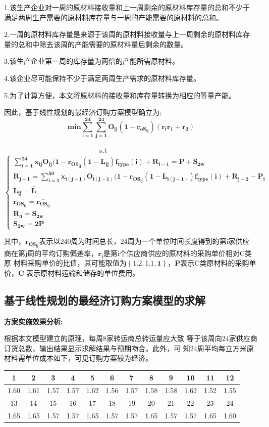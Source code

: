 \documentclass[UTF8]{ctexart}
\begin{document}
1.该生产企业对一周的原材料接收量和上一周剩余的原材料库存量的总和不少于
满足两周生产需要的原材料库存量与一周的产能需要的原材料的总和。

2.一周的原材料库存量是来源于该周的原材料接收量与上一周剩余的原材料库存
量的总和中除去该周的产能需要的原材料量后剩余的数量。

3.该生产企业第一周的库存量为两倍的产能所需原材料。

4.该企业尽可能保持不少于满足两周生产需求的原材料库存量。

5.为了计算方便，本文将原材料的接收量和库存量转换为相应的等量产能。

因此，基于线性规划的最经济订购方案模型确立为:
\begin{equation}
	\mathbf{min\sum_{i=1}^{24} \sum_{j=1}^{24}O_{ij}(1-r_{oS_{ij}})(r_{i}r_{1}+r_{2})}
\end{equation}\par
~~~~~~~~~~~~~~~~~~~~~~~~~~~s.t$\mathbf{\begin{cases}
	\sum_{i=1}^{24}x_{ij}O_{ij}(1-r_{OS_{ij}}(1-L_{ij})f_{type}(i)+R_{i-1}=P+S_{2w}  \\
	R_{j-1}=\sum_{i=1}^{50}x_{i(j-1)}O_{i(j-1)}(1-r_{OS_{ij}}(1-L_{i(j-1)})f_{type}(i)+R_{j-2}-P_{i} \\
	L_{ij}=\bar{L}  \\
	r_{OS_{ij}}=\bar{r_{OS_{ij}}}  \\
	R_{0}=S_{2w}   \\
	S_{2w}=2P
	\end{cases}}$

其中，$\mathbf{r_{OS_{ij}}}$表示以240周为时间总长，24周为一个单位时间长度得到的第i家供应
商在第j周的平均订购偏差率，$\mathbf{r_{i}}$是第i个供应商供应的原材料的采购单价相对C类原
材料采购单价的比值，其可能取值为$\mathbf{\left \{1.2,1.1,1  \right \} }$，$\mathbf{P}$表示C类原材料的采购单价，$\mathbf{C}$
表示原材料运输和储存的单位费用。


\subsection{基于线性规划的最经济订购方案模型的求解}
\textbf{方案实施效果分析:}

根据本文模型建立的原理，每周8家转运商总转运量应大致
等于该周向24家供应商订货总数，输出结果显示求解结果与预期吻合。此外，可
知24周平均每立方米原材料需单位成本如下，可见订购方案较为经济。
\begin{center}
	\begin{tabular}{||c c c c c c c c c c c c||}
		\hline
		1 & 2 & 3 & 4 & 5 & 6 & 7 & 8 & 9 & 10 & 11 & 12     \\ [0.5ex]
		\hline
		1.60 & 1.61 & 1.57 & 1.57 & 1.62 & 1.56 & 1.57 & 1.58 & 1.58 & 1.62 & 1.52 & 1.55      \\
		\hline
		13 & 14 & 15 & 16 & 17 & 18 & 19 & 20 & 21 & 22 & 23 & 24      \\
		\hline
		1.65 & 1.65 & 1.57 & 1.57 & 1.65 & 1.57  & 1.57 & 1.65 & 1.57 & 1.57 & 1.65 & 1.60     \\
		\hline
	\end{tabular}
\end{center}
\end{document}
